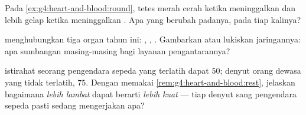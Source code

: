 \begin{exercise}[$\star\star$]\label{exo:g4:heart-and-blood:9}
Pada \cref{ex:g4:heart-and-blood:round}, tetes  merah cerah
ketika meninggalkan  dan lebih gelap ketika meninggalkan 
. Apa yang berubah padanya, pada tiap kalinya?
\end{exercise}

\begin{exercise}[$\star\star$]\label{exo:g4:heart-and-blood:10}
 menghubungkan tiga organ tahun ini: , ,
. Gambarkan atau lukiskan jaringannya: apa sumbangan
masing-masing bagi layanan pengantarannya?
\end{exercise}

\begin{exercise}[$\star\star\star$]\label{exo:g4:heart-and-blood:11}
 istirahat seorang pengendara sepeda yang terlatih dapat
$50$; denyut orang dewasa yang tidak terlatih, $75$. Dengan memakai
\cref{rem:g4:heart-and-blood:rest}, jelaskan bagaimana \emph{lebih
lambat} dapat berarti \emph{lebih kuat} --- tiap denyut sang
pengendara sepeda pasti sedang mengerjakan apa?
\end{exercise}
